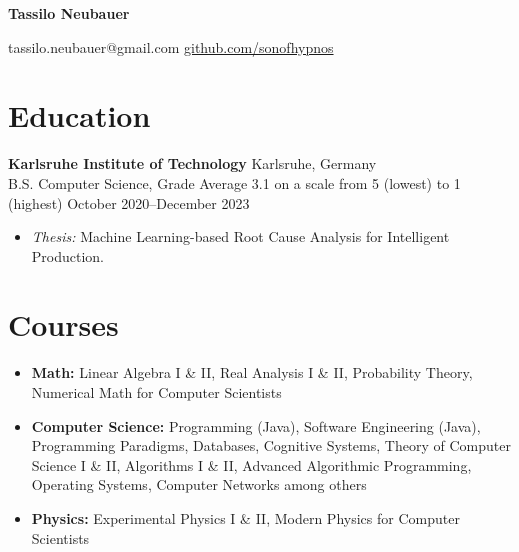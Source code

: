 \documentclass[letterpaper,9pt]{article}
\begin{document}
\begin{center}
\Huge\textbf{Tassilo Neubauer}

\vspace{0.5em}
\large
 \textcolor{accent}{tassilo.neubauer@gmail.com} \hspace{2em}
 \href{https://github.com/sonofhypnos}{github.com/sonofhypnos}
\end{center}

\section*{Education}
\textbf{Karlsruhe Institute of Technology} \hfill Karlsruhe, Germany \\
B.S. Computer Science, Grade Average 3.1 on a scale from 5 (lowest) to 1 (highest) \hfill October 2020--December 2023
\begin{itemize}
    \item \textit{Thesis:} Machine Learning-based Root Cause Analysis for Intelligent Production.
\end{itemize}

\section*{Courses}
\begin{itemize}
    \item \textbf{Math:} Linear Algebra I \& II, Real Analysis I \& II, Probability Theory, Numerical Math for Computer Scientists
    \item \textbf{Computer Science:} Programming (Java), Software Engineering (Java), Programming Paradigms, Databases, Cognitive Systems, Theory of Computer Science I \& II, Algorithms I \& II, Advanced Algorithmic Programming, Operating Systems, Computer Networks among others
    \item \textbf{Physics:} Experimental Physics I \& II, Modern Physics for Computer Scientists
\end{itemize}
\end{document}
